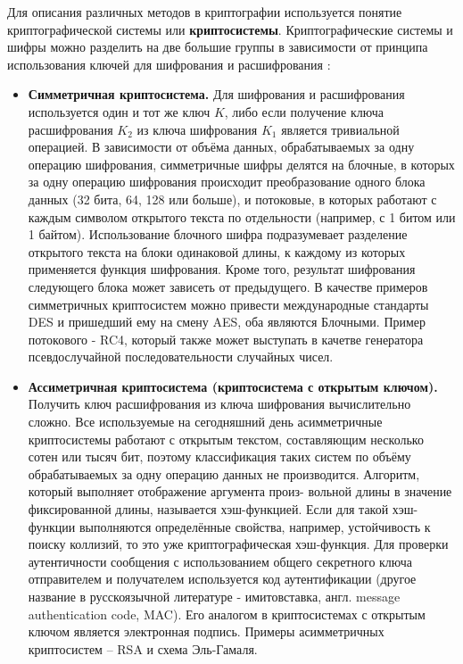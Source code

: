 Для описания различных методов в криптографии используется понятие криптографической системы или
\textbf{криптосистемы}.
Криптографические системы и шифры можно разделить на две большие группы в зависимости от принципа
использования ключей для шифрования и расшифрования \cite{crypto-methods}:
\begin{itemize}
    \item \textbf{Симметричная криптосистема.} Для шифрования и расшифрования используется один и
        тот же ключ $\mathit{K}$, либо если получение ключа расшифрования $\mathit{K_2}$ из ключа
        шифрования $\mathit{K_1}$ является тривиальной операцией. В зависимости от объёма данных,
        обрабатываемых за одну операцию шифрования, симметричные шифры делятся на блочные, в
        которых за одну операцию шифрования происходит преобразование одного блока данных (32 бита,
        64, 128 или больше), и потоковые, в которых работают с каждым символом открытого текста по
        отдельности (например, с 1 битом или 1 байтом). Использование блочного шифра подразумевает
        разделение открытого текста на блоки одинаковой длины, к каждому из которых применяется
        функция шифрования. Кроме того, результат шифрования следующего блока может зависеть от
        предыдущего. В качестве примеров симметричных криптосистем можно привести международные
        стандарты DES и пришедший ему на смену AES, оба являются Блочными. Пример потокового - RC4,
        который также может выступать в качетве генератора псевдослучайной последовательности
        случайных чисел.
    \item \textbf{Ассиметричная криптосистема (криптосистема с открытым ключом).} Получить ключ
        расшифрования из ключа шифрования вычислительно сложно. Все используемые на сегодняшний
        день асимметричные криптосистемы работают с
        открытым текстом, составляющим несколько сотен или тысяч бит, поэтому классификация таких
        систем по объёму обрабатываемых за одну операцию данных не производится. Алгоритм, который
        выполняет отображение аргумента произ- вольной длины в значение фиксированной длины,
        называется хэш-функцией. Если для такой хэш-функции выполняются определённые свойства,
        например, устойчивость к поиску коллизий, то это уже криптографическая хэш-функция.
        Для проверки аутентичности сообщения с использованием общего секретного ключа
        отправителем и получателем используется код аутентификации (другое название в
        русскоязычной литературе - имитовставка, англ. message authentication code, MAC).
        Его аналогом в криптосистемах с открытым ключом является
        электронная подпись. Примеры асимметричных криптосистем – RSA и схема Эль-Гамаля.
\end{itemize}

